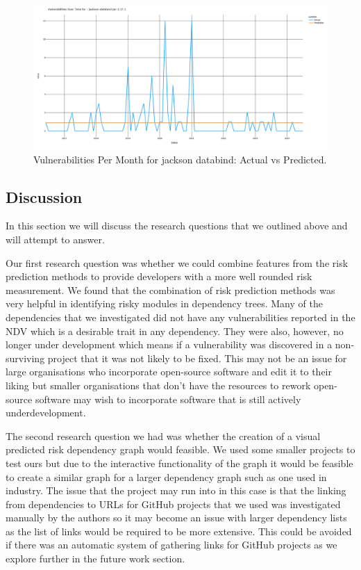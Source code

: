 \documentclass[conference]{IEEEtran}
\begin{document}
\begin{figure}[H]
    \centering
    \includegraphics[width=1\linewidth]{Const.png}
    \caption{Vulnerabilities Per Month for jackson databind: Actual vs Predicted.} 
    \label{fig:const}
\end{figure}

\subsection{Discussion}
In this section we will discuss the research questions that we outlined above and will attempt to answer. 

Our first research question was whether we could combine features from the risk prediction methods to provide developers with a more well rounded risk measurement. We found that the combination of risk prediction methods was very helpful in identifying risky modules in dependency trees. Many of the dependencies that we investigated did not have any vulnerabilities reported in the NDV which is a desirable trait in any dependency. They were also, however, no longer under development which means if a vulnerability was discovered in a non-surviving project that it was not likely to be fixed. This may not be an issue for large organisations who incorporate open-source software and edit it to their liking but smaller organisations that don't have the resources to rework open-source software may wish to incorporate software that is still actively underdevelopment.

The second research question we had was whether the creation of a visual predicted risk dependency graph would feasible. We used some smaller projects to test ours but due to the interactive functionality of the graph it would be feasible to create a similar graph for a larger dependency graph such as one used in industry. The issue that the project may run into in this case is that the linking from dependencies to URLs for GitHub projects that we used was investigated manually by the authors so it may become an issue with larger dependency lists as the list of links would be required to be more extensive. This could be avoided if there was an automatic system of gathering links for GitHub projects as we explore further in the future work section. 
\end{document}
